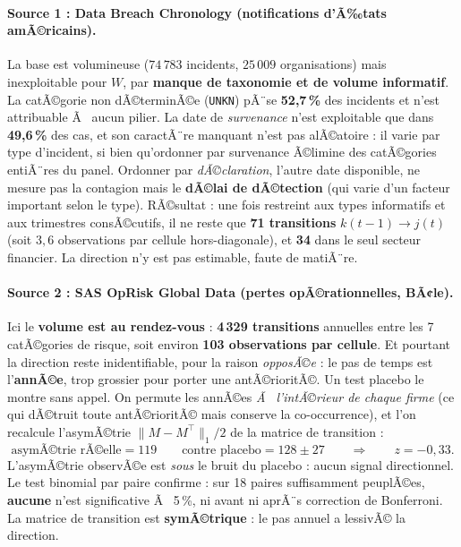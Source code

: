 ﻿\documentclass[11pt,a4paper]{article}
\begin{document}
\paragraph{Source 1 : Data Breach Chronology (notifications d'Ã‰tats amÃ©ricains).}
La base est volumineuse ($74\,783$ incidents, $25\,009$ organisations) mais inexploitable
pour $W$, par \textbf{manque de taxonomie et de volume informatif}. La catÃ©gorie
non dÃ©terminÃ©e (\texttt{UNKN}) pÃ¨se \textbf{52,7\,\%} des incidents et n'est attribuable Ã 
aucun pilier. La date de \emph{survenance} n'est exploitable que dans \textbf{49,6\,\%} des
cas, et son caractÃ¨re manquant n'est pas alÃ©atoire : il varie par type d'incident, si bien
qu'ordonner par survenance Ã©limine des catÃ©gories entiÃ¨res du panel. Ordonner par
\emph{dÃ©claration}, l'autre date disponible, ne mesure pas la contagion mais le
\textbf{dÃ©lai de dÃ©tection} (qui varie d'un facteur important selon le type). RÃ©sultat : une
fois restreint aux types informatifs et aux trimestres consÃ©cutifs, il ne reste que
\textbf{71 transitions} $k(t\!-\!1)\to j(t)$ (soit $3{,}6$ observations par cellule
hors-diagonale), et \textbf{34} dans le seul secteur financier. La direction n'y est pas
estimable, faute de matiÃ¨re.

\paragraph{Source 2 : SAS OpRisk Global Data (pertes opÃ©rationnelles, BÃ¢le).}
Ici le \textbf{volume est au rendez-vous} : \textbf{4\,329 transitions} annuelles entre les
7 catÃ©gories de risque, soit environ \textbf{103 observations par cellule}. Et pourtant la
direction reste inidentifiable, pour la raison \emph{opposÃ©e} : le pas de temps est
l'\textbf{annÃ©e}, trop grossier pour porter une antÃ©rioritÃ©. Un test placebo le montre sans
appel. On permute les annÃ©es \emph{Ã  l'intÃ©rieur de chaque firme} (ce qui dÃ©truit toute
antÃ©rioritÃ© mais conserve la co-occurrence), et l'on recalcule l'asymÃ©trie
$\lVert M - M^\top\rVert_1/2$ de la matrice de transition :
\[
\text{asymÃ©trie rÃ©elle} = 119 \qquad\text{contre placebo} = 128 \pm 27
\qquad\Rightarrow\qquad z = -0{,}33 .
\]
L'asymÃ©trie observÃ©e est \emph{sous} le bruit du placebo : aucun signal directionnel. Le
test binomial par paire confirme : sur 18 paires suffisamment peuplÃ©es, \textbf{aucune}
n'est significative Ã  5\,\%, ni avant ni aprÃ¨s correction de Bonferroni. La matrice de
transition est \textbf{symÃ©trique} : le pas annuel a lessivÃ© la direction.
\end{document}

